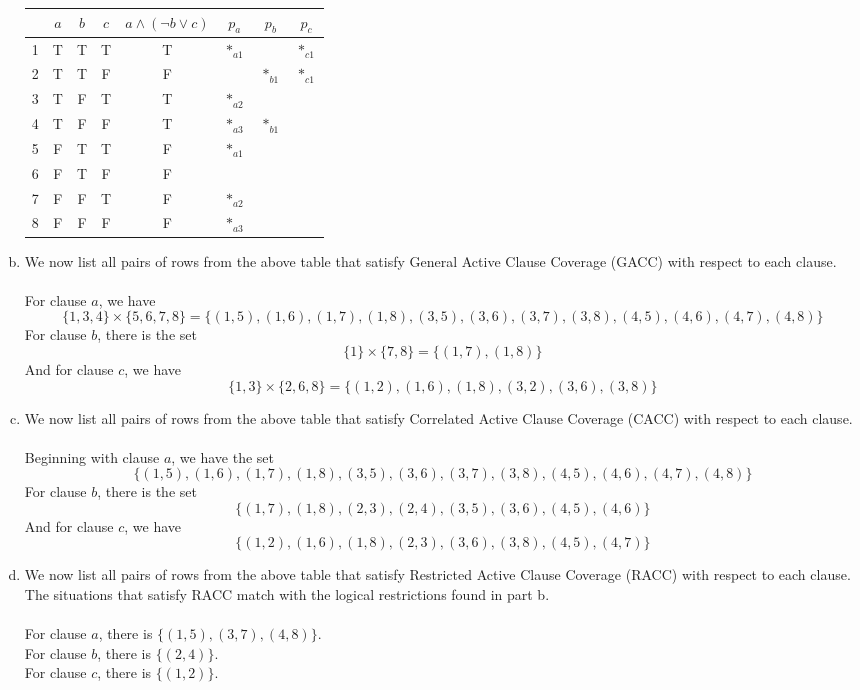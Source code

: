 \documentclass{article}
\begin{document}
\begin{enumerate}[(a)]
		\begin{center}
			\begin{tabular}{|c|c|c|c||c|c|c|c|} 
				\hline
				& $a$ & $b$ & $c$ & $ a \land ( \lnot b \lor c ) $ & $p_a$ & $p_b$ & $p_c$ \\ [1ex] 
				\hline
				1 & T & T & T & T & $*_{a1}$ &  		& $*_{c1}$  \\
				\hline
				2 & T & T & F & F & 		 & $*_{b1}$ & $*_{c1}$  \\
				\hline
				3 & T & F & T & T & $*_{a2}$ & 			&  			\\
				\hline
				4 & T & F & F & T & $*_{a3}$ & $*_{b1}$ &  			\\
				\hline
				5 & F & T & T & F & $*_{a1}$ & 			&  			\\
				\hline
				6 & F & T & F & F &  		 &  		&  			\\
				\hline
				7 & F & F & T & F & $*_{a2}$ &  		&  			\\
				\hline
				8 & F & F & F & F & $*_{a3}$ &  		&  			\\
				\hline
			\end{tabular}
		\end{center}
	\item We now list all pairs of rows from the above table that satisfy General Active Clause Coverage (GACC) with respect to each clause. \\\\
	For clause $a$, we have
		$$ \{ 1, 3, 4 \} \times \{ 5, 6, 7, 8 \} = \{ (1, 5), (1, 6), (1, 7), (1, 8),
			  (3, 5), (3, 6), (3, 7), (3, 8),
			  (4, 5), (4, 6), (4, 7), (4, 8) \} $$
	For clause $b$, there is the set
		$$ \{ 1 \} \times \{ 7, 8 \} = \{ (1, 7), (1, 8) \} $$
	And for clause $c$, we have
		$$ \{ 1, 3 \} \times \{ 2, 6, 8 \} = \{ (1, 2), (1, 6), (1, 8), (3, 2), (3, 6), (3, 8) \} $$
	\item We now list all pairs of rows from the above table that satisfy Correlated Active Clause Coverage (CACC) with respect to each clause. \\\\
	Beginning with clause $a$, we have the set 
		$$ \{ (1, 5), (1, 6), (1, 7), (1, 8),
			  (3, 5), (3, 6), (3, 7), (3, 8),
			  (4, 5), (4, 6), (4, 7), (4, 8) \} $$
	For clause $b$, there is the set
		$$ \{ (1, 7), (1, 8), (2, 3), (2, 4), 
			  (3, 5), (3, 6), (4, 5), (4, 6) \} $$
	And for clause $c$, we have
		$$ \{ (1, 2), (1, 6), (1, 8), (2, 3),
		 	  (3, 6), (3, 8), (4, 5), (4, 7) \} $$
	\item We now list all pairs of rows from the above table that satisfy Restricted Active Clause Coverage (RACC) with respect to each clause.  The situations that satisfy RACC match with the logical restrictions found in part b. \\\\
	For clause $a$, there is $ \{ (1, 5), (3, 7), (4, 8) \} $. \\
	For clause $b$, there is $ \{ (2, 4) \} $. \\
	For clause $c$, there is $ \{ (1, 2) \} $.
\end{enumerate}
\end{document}
